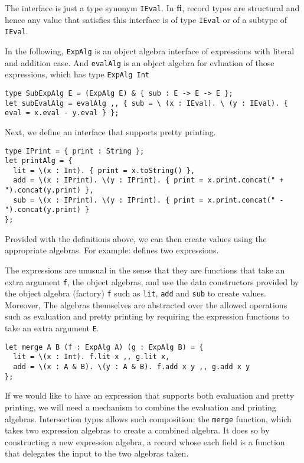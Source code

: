 \documentclass[preprint]{sigplanconf}
\newcommand{\systemFI}{{\bf fi}}
\begin{document}
The interface is just a type synonym \lstinline{IEval}. In \systemFI, record
types are structural and hence any value that satisfies this interface is of
type \lstinline{IEval} or of a subtype of \lstinline{IEval}.

In the following, \lstinline{ExpAlg} is an object algebra interface of
expressions with literal and addition case. And \lstinline{evalAlg} is an object
algebra for evluation of those expressions, which has type \lstinline{ExpAlg Int}

\begin{verbatim}
type SubExpAlg E = (ExpAlg E) & { sub : E -> E -> E };
let subEvalAlg = evalAlg ,, { sub = \ (x : IEval). \ (y : IEval). { eval = x.eval - y.eval } };
\end{verbatim}

Next, we define an interface that supports pretty printing.

\begin{verbatim}
type IPrint = { print : String };
let printAlg = {
  lit = \(x : Int). { print = x.toString() },
  add = \(x : IPrint). \(y : IPrint). { print = x.print.concat(" + ").concat(y.print) },
  sub = \(x : IPrint). \(y : IPrint). { print = x.print.concat(" - ").concat(y.print) }
};
\end{verbatim}

Provided with the definitions above, we can then create values using the
appropriate algebras. For example:
defines two expressions.

The expressions are unusual in the sense that they are functions that take an
extra argument \lstinline{f}, the object algebras, and use the data constructors
provided by the object algebra (factory) \lstinline{f} such as \lstinline{lit},
\lstinline{add} and \lstinline{sub} to create values. Moreover, The algebras
themselves are abstracted over the allowed operations such as evaluation and
pretty printing by requiring the expression functions to take an extra argument
\lstinline{E}.

\begin{verbatim}
let merge A B (f : ExpAlg A) (g : ExpAlg B) = {
  lit = \(x : Int). f.lit x ,, g.lit x,
  add = \(x : A & B). \(y : A & B). f.add x y ,, g.add x y
};
\end{verbatim}

If we would like to have an expression that supports both evaluation and pretty
printing, we will need a mechanism to combine the evaluation and printing
algebras. Intersection types allows such composition: the \lstinline{merge}
function, which takes two expression algebras to create a combined algebra. It
does so by constructing a new expression algebra, a record whose each field is a
function that delegates the input to the two algebras taken.
\end{document}
